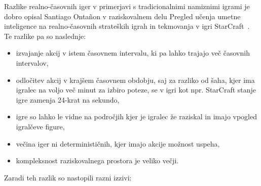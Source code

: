 \documentclass[a4paper, 12pt]{book}
\begin{document}
Razlike realno-časovnih iger v primerjavi s tradicionalnimi namiznimi igrami je dobro opisal Santiago Ontañon v raziskovalnem delu Pregled učenja umetne inteligence na realno-časovnih strateških igrah in tekmovanja v igri StarCraft~\cite{survey_real_time_strategy_ai_research_starcraft}.
Te razlike pa so naslednje:
\begin{itemize}
	\item izvajanje akcij v istem časovnem intervalu, ki pa lahko trajajo več časovnih intervalov,
	\item odločitev akcij v krajšem časovnem obdobju, saj za razliko od šaha, kjer ima igralec na voljo več minut za izbiro poteze, se v igri kot npr. StarCraft stanje igre zamenja 24-krat na sekundo,
	\item igre so lahko le vidne na področjih kjer je igralec že raziskal in imajo vpogled igralčeve figure,
	\item večina iger ni determinističnih, kjer imajo akcije možnost uspeha,
	\item kompleksnost raziskovalnega prostora je veliko večji.

\end{itemize}

Zaradi teh razlik so nastopili razni izzivi:
\end{document}
